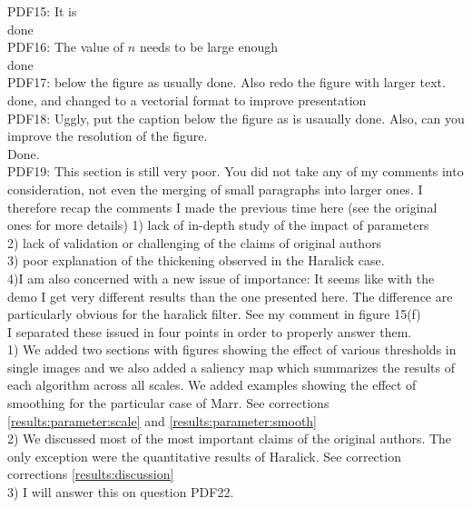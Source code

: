 \documentclass[a4paper,10pt]{report}
\begin{document}
\que PDF15: It is\\
\ans done\\

\que PDF16: The value of $n$ needs to be large enough\\
\ans done\\

\que PDF17: below the figure as usually done.
Also redo the figure with larger text.\\
\ans done, and changed to a vectorial format to improve presentation\\

\que PDF18: Uggly, put the caption below the figure as is usaually done. Also, can you improve the resolution of the figure.\\
\ans Done.\\

\que PDF19: This section is still very poor. 
You did not take any of my comments into consideration, not even the merging of small paragraphs into larger ones.
I therefore recap the comments I made the previous time here (see the original ones for more details)
1) lack of in-depth study of the impact of parameters\\
2) lack of validation or challenging of the claims of original authors\\
3) poor explanation of the thickening observed in the Haralick case.\\

4)I am also concerned with a new issue of importance: It seems like with the demo I get very different results  than the one presented here. The difference are particularly obvious for the haralick filter. See my comment in figure 15(f)\\

\ans I separated these issued in four points in order to properly answer them.\\
1) We added two sections with figures showing the effect of various thresholds in single images and we also added a saliency map which summarizes the results of each algorithm across all scales. We added examples showing the effect of smoothing for the particular case of Marr. See corrections \ref{results:parameter:scale} and \ref{results:parameter:smooth}\\
2) We discussed most of the most important claims of the original authors. The only exception were the quantitative results of Haralick. See correction corrections \ref{results:discussion} \\
3) I will answer this on question PDF22.\\
\end{document}
